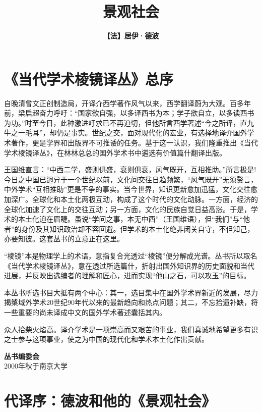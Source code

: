 \documentclass[fontset=fandol, a4paper, 12pt, openright]{ctexbook}
\title{\Huge \textbf{景观社会}\\}
\author{\textbf{【法】居伊·德波}}
\date{}
\begin{document}
\frontmatter

\maketitle

\chapter*{《当代学术棱镜译丛》总序}

{\kaishu 自晚清曾文正创制造局，开译介西学著作风气以来，西学翻译蔚为大观。百多年前，梁启超奋力呼吁：“国家欲自强，以多译西书为本；学子欲自立，以多读西书为功。”时至今日，此种激进吁求已不再迫切，但他所言西学著述“今之所译，直九牛之一毛耳”，却仍是事实。世纪之交，面对现代化的宏业，有选择地译介国外学术著作，更是学界和出版界不可推诿的任务。基于这一认识，我们隆重推出《当代学术棱镜译丛》，在林林总总的国外学术书中遴选有价值篇什翻译出版。}

{\kaishu 王国维直言：“中西二学，盛则俱盛，衰则俱衰，风气既开，互相推助。”所言极是!今日之中国已迥异于一个世纪以前，文化间交往日趋频繁，“风气既开”无须赘言，中外学术“互相推助”更是不争的事实。当今世界，知识更新愈加迅猛，文化交往愈加深广。全球化和本土化两极互动，构成了这个时代的文化动脉。一方面，经济的全球化加速了文化上的交往互动；另一方面，文化的民族自觉日益高涨。于是，学术的本土化迫在眉睫。虽说“学问之事，本无中西”（王国维语），但“我们”与“他者”的身份及其知识政治却不容回避。但学术的本土化绝非闭关自守，不但知己，亦要知彼。这套丛书的立意正在这里。}

{\kaishu “棱镜”本是物理学上的术语，意指复合光透过“棱镜”便分解成光谱。丛书所以取名《当代学术棱镜译丛》，意在透过所选篇什，折射出国外知识界的历史面貌和当代进展，并反映出选编者的理解和匠心，进而实现“他山之石，可以攻玉”的目标。}

{\kaishu 本丛书所选书目大抵有两个中心：其一，选目集中在国外学术界新近的发展，尽力揭橥域外学术20世纪90年代以来的最新趋向和热点问题；其二，不忘拾遗补缺，将一些重要的尚未译成中文的国外学术著述囊括其内。}

{\kaishu 众人拾柴火焰高。译介学术是一项崇高而又艰苦的事业，我们真诚地希望更多有识之士参与这项事业，使之为中国的现代化和学术本土化作出贡献。}

\begin{flushright}
\textbf{丛书编委会}\\
2000年秋于南京大学
\end{flushright}

\chapter*{代译序：德波和他的《景观社会》\footnotemark}
\end{document}
